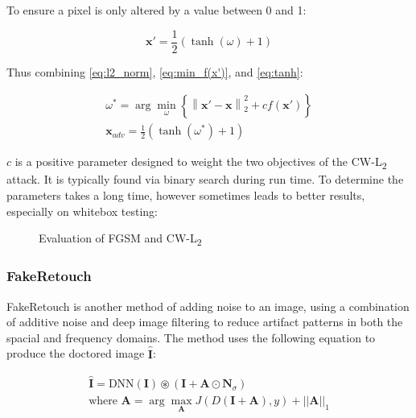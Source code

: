 \documentclass{article}
\begin{document}
To ensure a pixel is only altered by a value between 0 and 1:

\begin{equation}
\label{eq:tanh}
    \mathbf{x}' = \frac{1}{2}(\tanh (\omega ) + 1)
\end{equation}

Thus combining \ref{eq:l2_norm}, \ref{eq:min_f(x')}, and \ref{eq:tanh}:

\begin{equation}
\begin{array}{c}
    \omega^\ast = \arg \min_\omega \left\{ \left\| \mathbf{x}' - \mathbf{x} \right\|_2^2 + cf\left( \mathbf{x}' \right) \right\} \\
    \mathbf{x}_{adv} = \frac{1}{2}\left( \tanh \left( \omega^\ast \right) + 1 \right)
\end{array}
\end{equation}

$c$ is a positive parameter designed to weight the two objectives of the CW-L\textsubscript{2} attack. It is typically found via binary search during run time. To determine the parameters takes a long time, however sometimes leads to better results, especially on whitebox testing:

\begin{figure}[H]
    \centering
    \caption{Evaluation of FGSM and CW-L\textsubscript{2}}
    \label{fig:fgsm}
\end{figure}

\subsubsection{FakeRetouch}

FakeRetouch is another method of adding noise to an image, using a combination of additive noise and deep image filtering to reduce artifact patterns in both the spacial and frequency domains\cite{huang2020fakeretouch}. The method uses the following equation to produce the doctored image $\hat{\mathbf{I}}$:

\begin{equation}
\begin{array}{c}
    \hat{\mathbf{I}}=\text{DNN}(\mathbf{I})\circledast (\mathbf{I} +\mathbf{A}\odot \mathbf{N}_{\sigma}) \\
    \text{where }\mathbf{A}=\arg \max _{\mathbf{A}}J(D(\mathbf{I}+\mathbf{A}), y) +||\mathbf{A}||_1
\end{array}
\end{equation}
\end{document}
